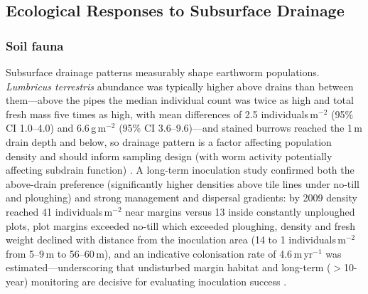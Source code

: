 \subsection{Ecological Responses to Subsurface Drainage}

\subsubsection{Soil fauna}
Subsurface drainage patterns measurably shape earthworm populations. \textit{Lumbricus terrestris} abundance was typically higher above drains than between them---above the pipes the median individual count was twice as high and total fresh mass five times as high, with mean differences of 2.5 individuals\,m$^{-2}$ (95\% CI 1.0--4.0) and 6.6\,g\,m$^{-2}$ (95\% CI 3.6--9.6)---and stained burrows reached the 1\,m drain depth and below, so drainage pattern is a factor affecting population density and should inform sampling design (with worm activity potentially affecting subdrain function) \parencite{Nuutinen2001}. A long-term inoculation study confirmed both the above-drain preference (significantly higher densities above tile lines under no-till and ploughing) and strong management and dispersal gradients: by 2009 density reached 41 individuals\,m$^{-2}$ near margins versus 13 inside constantly unploughed plots, plot margins exceeded no-till which exceeded ploughing, density and fresh weight declined with distance from the inoculation area (14 to 1 individuals\,m$^{-2}$ from 5--9\,m to 56--60\,m), and an indicative colonisation rate of 4.6\,m\,yr$^{-1}$ was estimated---underscoring that undisturbed margin habitat and long-term ($>$10-year) monitoring are decisive for evaluating inoculation success \parencite{Nuutinen2011}.

